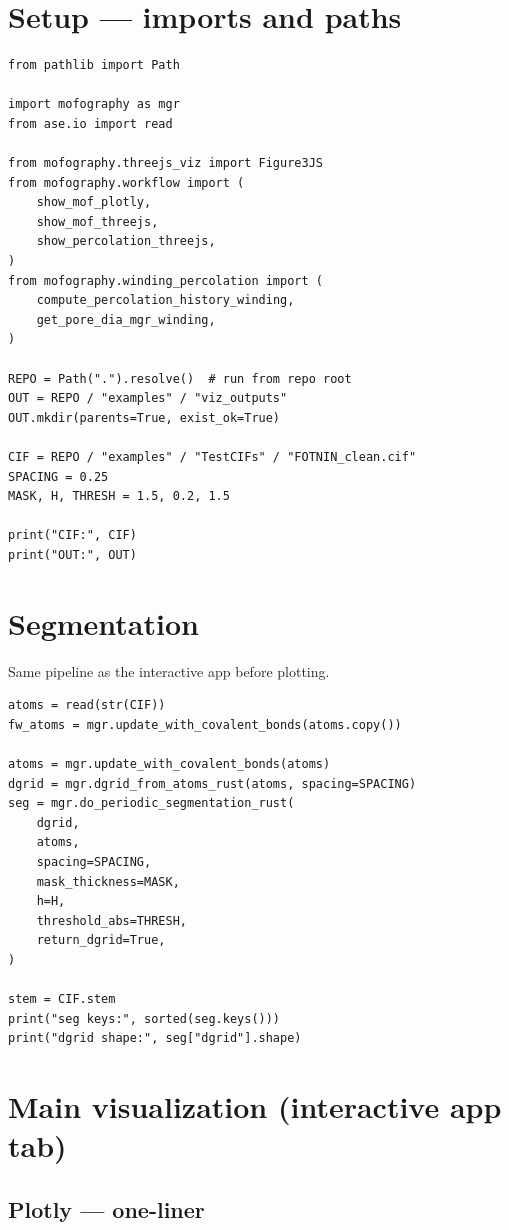 \documentclass[11pt]{article}
\begin{document}
\section{Setup — imports and paths}
\label{sec:org33767c0}

\begin{verbatim}
from pathlib import Path

import mofography as mgr
from ase.io import read

from mofography.threejs_viz import Figure3JS
from mofography.workflow import (
    show_mof_plotly,
    show_mof_threejs,
    show_percolation_threejs,
)
from mofography.winding_percolation import (
    compute_percolation_history_winding,
    get_pore_dia_mgr_winding,
)

REPO = Path(".").resolve()  # run from repo root
OUT = REPO / "examples" / "viz_outputs"
OUT.mkdir(parents=True, exist_ok=True)

CIF = REPO / "examples" / "TestCIFs" / "FOTNIN_clean.cif"
SPACING = 0.25
MASK, H, THRESH = 1.5, 0.2, 1.5

print("CIF:", CIF)
print("OUT:", OUT)
\end{verbatim}
\section{Segmentation}
\label{sec:orga87f95e}

Same pipeline as the interactive app before plotting.

\begin{verbatim}
atoms = read(str(CIF))
fw_atoms = mgr.update_with_covalent_bonds(atoms.copy())

atoms = mgr.update_with_covalent_bonds(atoms)
dgrid = mgr.dgrid_from_atoms_rust(atoms, spacing=SPACING)
seg = mgr.do_periodic_segmentation_rust(
    dgrid,
    atoms,
    spacing=SPACING,
    mask_thickness=MASK,
    h=H,
    threshold_abs=THRESH,
    return_dgrid=True,
)

stem = CIF.stem
print("seg keys:", sorted(seg.keys()))
print("dgrid shape:", seg["dgrid"].shape)
\end{verbatim}
\section{Main visualization (interactive app tab)}
\label{sec:org0836850}

\subsection{Plotly — one-liner}
\label{sec:org816b5a4}
\end{document}
